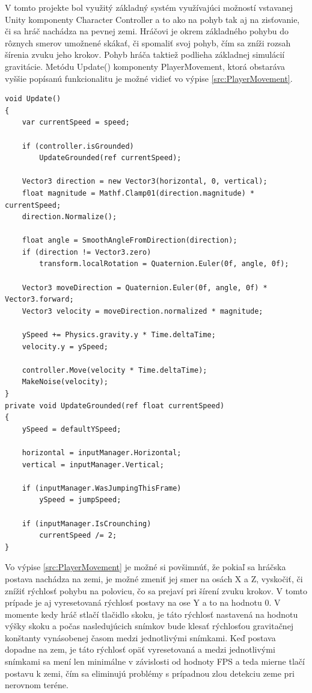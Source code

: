 \documentclass[slovak, master]{diploma}
\begin{document}
V tomto projekte bol využitý základný systém využívajúci možností vstavanej Unity komponenty Character Controller a to ako na pohyb tak aj na zisťovanie, či sa hráč nachádza na pevnej zemi. Hráčovi je okrem základného pohybu do rôznych smerov umožnené skákať, či spomaliť svoj pohyb, čím sa zníži rozsah šírenia zvuku jeho krokov. Pohyb hráča taktiež podlieha základnej simulácií gravitácie. Metódu Update() komponenty PlayerMovement, ktorá obstaráva vyššie popísanú funkcionalitu je možné vidieť vo výpise \ref{src:PlayerMovement}.

\vspace{8pt}
\begin{lstlisting}[label=src:PlayerMovement,caption={Realizácia pohybu hráčskej postavy}]
void Update()
{
    var currentSpeed = speed;

    if (controller.isGrounded)
        UpdateGrounded(ref currentSpeed);

    Vector3 direction = new Vector3(horizontal, 0, vertical);
    float magnitude = Mathf.Clamp01(direction.magnitude) * currentSpeed;
    direction.Normalize();

    float angle = SmoothAngleFromDirection(direction);
    if (direction != Vector3.zero)
        transform.localRotation = Quaternion.Euler(0f, angle, 0f);

    Vector3 moveDirection = Quaternion.Euler(0f, angle, 0f) * Vector3.forward;
    Vector3 velocity = moveDirection.normalized * magnitude;

    ySpeed += Physics.gravity.y * Time.deltaTime;
    velocity.y = ySpeed;

    controller.Move(velocity * Time.deltaTime);
    MakeNoise(velocity);
}
private void UpdateGrounded(ref float currentSpeed)
{
    ySpeed = defaultYSpeed;

    horizontal = inputManager.Horizontal;
    vertical = inputManager.Vertical;

    if (inputManager.WasJumpingThisFrame)
        ySpeed = jumpSpeed;

    if (inputManager.IsCrounching)
        currentSpeed /= 2;
}
\end{lstlisting}

Vo výpise \ref{src:PlayerMovement} je možné si povšimnúť, že pokiaľ sa hráčska postava nachádza na zemi, je možné zmeniť jej smer na osách X a Z, vyskočiť, či znížiť rýchlosť pohybu na polovicu, čo sa prejaví pri šírení zvuku krokov. V tomto prípade je aj vyresetovaná rýchlosť postavy na ose Y a to na hodnotu 0. V momente kedy hráč stlačí tlačidlo skoku, je táto rýchlosť nastavená na hodnotu výšky skoku a počas nasledujúcich snímkov bude klesať rýchlosťou gravitačnej konštanty vynásobenej časom medzi jednotlivými snímkami. Keď postava dopadne na zem, je táto rýchlosť opäť vyresetovaná a medzi jednotlivými snímkami sa mení len minimálne v závislosti od hodnoty FPS a teda mierne tlačí postavu k zemi, čím sa eliminujú problémy s prípadnou zlou detekciu zeme pri nerovnom teréne.
\end{document}
